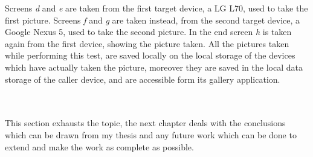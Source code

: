Screens \textit{d} and \textit{e} are taken from the first target device, a LG L70, used to take the first picture. Screens \textit{f} and \textit{g} are taken instead, from the second target device, a Google Nexus 5, used to take the second picture. In the end screen \textit{h} is taken again from the first device, showing the picture taken. All the pictures taken while performing this test, are saved locally on the local storage of the devices which have actually taken the picture, moreover they are saved in the local data storage of the caller device, and are accessible form its gallery application.
\\\\\\
\par This section exhausts the topic, the next chapter deals with the conclusions which can be drawn from my thesis and any future work which can be done to extend and make the work as complete as possible.